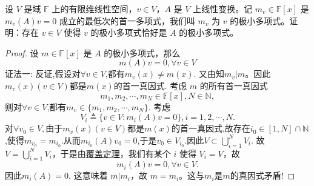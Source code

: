 \documentclass[../../main.tex]{subfiles}
\begin{document}
\begin{example}
设 \( V \) 是域 \( \mathbb{F} \) 上的有限维线性空间，\( v \in V \)，\( A \) 是 \( V \) 上线性变换。记 \( m_v \in \mathbb{F}[x] \) 是 \( m_v(A)v = 0 \) 成立的最低次的首一多项式，我们叫 \( m_v \) 为 \( v \) 的极小多项式。证明：存在 \( v \in V \) 使得 \( v \) 的极小多项式恰好是 \( A \) 的极小多项式。
\end{example}
\begin{proof}
设 \( m \in \mathbb{F}[x] \) 是 \( A \) 的极小多项式，那么
\[
m(A)v = 0, \forall v \in V
\]
{\color{blue}证法一:}
反证,假设对$\forall v\in V$,都有$m_v(x)\ne m(x)$.
又由知\( m_v|m \)。因此$m_v(x)(v\in V)$都是$m(x)$的首一真因式.
考虑 \( m \) 的所有首一真因式
\[
m_1, m_2, \cdots, m_N \in \mathbb{F}[x],N\in\mathbb{N},
\]
则对$\forall v\in V$,都有$m_v\in \{m_1,m_2,\cdots,m_N\}$.
考虑
\[
V_i \triangleq \{ v \in V : m_i(A)v = 0 \}, i = 1, 2, \cdots, N.
\]
对$\forall v_0\in V,$由于$m_v(x)(v\in V)$都是$m(x)$的首一真因式,故存在$i_0\in [1,N]\cap \mathbb{N}$,使得$m_{v_0}=m_{i_0}$.从而$m_{i_0}(A)v_0=0$,于是$v_0\in V_{i_0}.$因此$V\subset \bigcup_{i=1}^N V_i.$
故\( V = \bigcup_{i=1}^N V_i \)，于是由\hyperref[theorem:覆盖定理]{覆盖定理}，我们有某个 \( i \) 使得 \( V_i = V \)，故$$m_i(A)v=0,\forall v\in V.$$
因此$m_i(A)=0.$
这意味着 \( m | m_i \)，故 \( m = m_i\)。这与$m_i$是$m$的真因式矛盾!

\end{proof}
\end{document}
